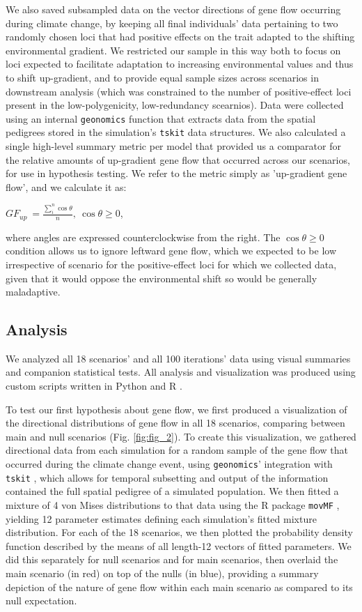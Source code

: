 \documentclass[9pt,twocolumn,twoside,lineno]{pnas-new}
\begin{document}
{We also saved subsampled data on the vector directions
of gene flow occurring during climate change, by keeping all final individuals'
data pertaining to two randomly chosen loci that had positive
effects on the trait adapted to the shifting environmental gradient.
We restricted our sample in this way both to focus on loci expected to facilitate 
adaptation to increasing environmental values and thus to shift up-gradient, and to 
provide equal sample sizes across scenarios in downstream analysis (which was 
constrained to the number of positive-effect loci present in
the low-polygenicity, low-redundancy scearnios). 
Data were collected using an internal \texttt{geonomics} function
that extracts data from the spatial pedigrees stored in the
simulation's \texttt{tskit} \cite{kelleher} data structures.
We also calculated a single high-level summary metric per model
that provided us a comparator for the relative amounts of
up-gradient gene flow that occurred across our scenarios,
for use in hypothesis testing.
We refer to the metric simply as 'up-gradient gene flow',
and we calculate it as:

$GF_{up}\ = \frac{\sum\limits_{i}^{n}\cos\theta}{n},\ \cos\theta\geq0$,

where angles are expressed counterclockwise from the right.
The $\cos\theta\geq0$ condition allows us to ignore leftward gene flow,
which we expected to be low irrespective of scenario for the positive-effect loci
for which we collected data,
given that it would oppose the environmental shift so would be generally maladaptive.


\subsection*{Analysis}

We analyzed all 18 scenarios' and all 100 iterations' data
using visual summaries and companion statistical tests.
All analysis and visualization was produced using custom scripts written in 
Python and R \cite{r_core_team}.

To test our first hypothesis about gene flow,
we first produced a visualization of the directional 
distributions of gene flow in all 18 scenarios, comparing between main
and null scenarios (Fig. \ref{fig:fig_2}).
To create this visualization, we gathered directional data
from each simulation for a random 
sample of the gene flow that occurred during the climate change event, using 
\texttt{geonomics}' integration with \texttt{tskit} \cite{kelleher}, which allows for temporal 
subsetting and output of the information contained the full spatial pedigree of a 
simulated population. We then fitted a mixture of 4 von Mises distributions to that data
using the R package \texttt{movMF} \cite{hornik},
yielding 12 parameter estimates defining each simulation's fitted mixture distribution. For each of 
the 18 scenarios, we then plotted the probability density function 
described by the means of all length-12 vectors of fitted parameters. We did this 
separately for null scenarios and for main scenarios, then overlaid the main scenario (in red)
on top of the nulls (in blue), providing a summary depiction of the nature of gene flow within each 
main scenario as compared to its null expectation.

}
\end{document}
